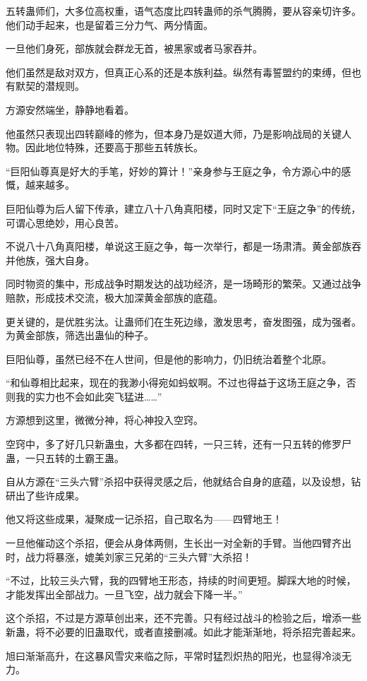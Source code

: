 \begin{this_body}
五转蛊师们，大多位高权重，语气态度比四转蛊师的杀气腾腾，要从容亲切许多。他们动手起来，也是留着三分力气、两分情面。

一旦他们身死，部族就会群龙无首，被黑家或者马家吞并。

他们虽然是敌对双方，但真正心系的还是本族利益。纵然有毒誓盟约的束缚，但也有默契的潜规则。

方源安然端坐，静静地看着。

他虽然只表现出四转巅峰的修为，但本身乃是奴道大师，乃是影响战局的关键人物。因此地位特殊，还要高于那些五转族长。

“巨阳仙尊真是好大的手笔，好妙的算计！”亲身参与王庭之争，令方源心中的感慨，越来越多。

巨阳仙尊为后人留下传承，建立八十八角真阳楼，同时又定下“王庭之争”的传统，可谓心思绝妙，用心良苦。

不说八十八角真阳楼，单说这王庭之争，每一次举行，都是一场肃清。黄金部族吞并他族，强大自身。

同时物资的集中，形成战争时期发达的战功经济，是一场畸形的繁荣。又通过战争赔款，形成技术交流，极大加深黄金部族的底蕴。

更关键的，是优胜劣汰。让蛊师们在生死边缘，激发思考，奋发图强，成为强者。为黄金部族，筛选出蛊仙的种子。

巨阳仙尊，虽然已经不在人世间，但是他的影响力，仍旧统治着整个北原。

“和仙尊相比起来，现在的我渺小得宛如蚂蚁啊。不过也得益于这场王庭之争，否则我的实力也不会如此突飞猛进……”

方源想到这里，微微分神，将心神投入空窍。

空窍中，多了好几只新蛊虫，大多都在四转，一只三转，还有一只五转的修罗尸蛊，一只五转的土霸王蛊。

自从方源在“三头六臂”杀招中获得灵感之后，他就结合自身的底蕴，以及设想，钻研出了些许成果。

他又将这些成果，凝聚成一记杀招，自己取名为——四臂地王！

一旦他催动这个杀招，便会从身体两侧，生长出一对全新的手臂。当他四臂齐出时，战力将暴涨，媲美刘家三兄弟的“三头六臂”大杀招！

“不过，比较三头六臂，我的四臂地王形态，持续的时间更短。脚踩大地的时候，才能发挥出全部战力。一旦飞空，战力就会下降一半。”

这个杀招，不过是方源草创出来，还不完善。只有经过战斗的检验之后，增添一些新蛊，将不必要的旧蛊取代，或者直接删减。如此才能渐渐地，将杀招完善起来。

旭曰渐渐高升，在这暴风雪灾来临之际，平常时猛烈炽热的阳光，也显得冷淡无力。


\end{this_body}
